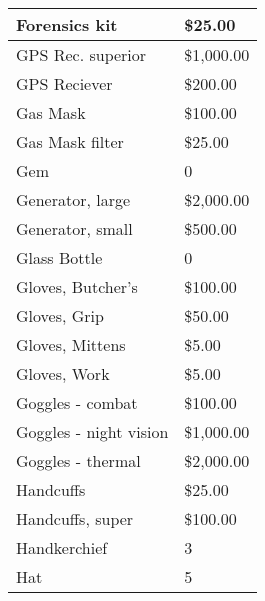 \documentclass[twoside]{book}
\begin{document}
\begin{longtable}{p{1.25in}l}
  \raggedright
           Forensics kit 
  &
   \$25.00 
  \tabularnewline
  \hline
      
  \raggedright
           GPS Rec. superior 
  &
   \$1,000.00 
  \tabularnewline
  \hline
      
  \raggedright
           GPS Reciever 
  &
   \$200.00 
  \tabularnewline
  \hline
      
  \raggedright
           Gas Mask 
  &
   \$100.00 
  \tabularnewline
  \hline
      
  \raggedright
           Gas Mask filter 
  &
   \$25.00 
  \tabularnewline
  \hline
      
  \raggedright
           Gem 
  &
   0 
  \tabularnewline
  \hline
      
  \raggedright
           Generator, large 
  &
   \$2,000.00 
  \tabularnewline
  \hline
      
  \raggedright
           Generator, small 
  &
   \$500.00 
  \tabularnewline
  \hline
      
  \raggedright
           Glass Bottle 
  &
   0 
  \tabularnewline
  \hline
      
  \raggedright
           Gloves, Butcher's 
  &
   \$100.00 
  \tabularnewline
  \hline
      
  \raggedright
           Gloves, Grip 
  &
   \$50.00 
  \tabularnewline
  \hline
      
  \raggedright
           Gloves, Mittens 
  &
   \$5.00 
  \tabularnewline
  \hline
      
  \raggedright
           Gloves, Work 
  &
   \$5.00 
  \tabularnewline
  \hline
      
  \raggedright
           Goggles - combat 
  &
   \$100.00 
  \tabularnewline
  \hline
      
  \raggedright
           Goggles - night vision 
  &
   \$1,000.00 
  \tabularnewline
  \hline
      
  \raggedright
           Goggles - thermal 
  &
   \$2,000.00 
  \tabularnewline
  \hline
      
  \raggedright
           Handcuffs 
  &
   \$25.00 
  \tabularnewline
  \hline
      
  \raggedright
           Handcuffs, super 
  &
   \$100.00 
  \tabularnewline
  \hline
      
  \raggedright
           Handkerchief 
  &
   3 
  \tabularnewline
  \hline
      
  \raggedright
           Hat 
  &
   5 
  \tabularnewline
  \hline
      

\end{longtable}
\end{document}
